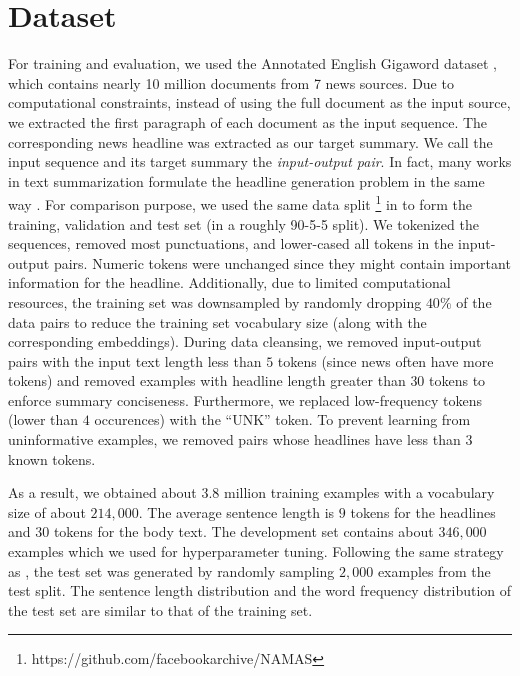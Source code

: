 \section{Dataset}
\label{sec: dataset}

For training and evaluation, we used the Annotated English Gigaword dataset \cite{graff2003english}, which contains nearly 10 million documents from 7 news sources. Due to computational constraints, instead of using the full document as the input source, we extracted the first paragraph of each document as the input sequence. The corresponding news headline was extracted as our target summary. We call the input sequence and its target summary the \textit{input-output pair}. In fact, many works in text summarization formulate the headline generation problem in the same way \cite{rush2015neural}. For comparison purpose, we used the same data split \footnote{https://github.com/facebookarchive/NAMAS} in \cite{rush2015neural} to form the training, validation and test set (in a roughly 90-5-5 split). We tokenized the sequences, removed most punctuations, and lower-cased all tokens in the input-output pairs. Numeric tokens were unchanged since they might contain important information for the headline. Additionally, due to limited computational resources, the training set was downsampled by randomly dropping $40\%$ of the data pairs to reduce the training set vocabulary size (along with the corresponding embeddings). During data cleansing, we removed input-output pairs with the input text length less than $5$ tokens (since news often have more tokens) and removed examples with headline length greater than $30$ tokens to enforce summary conciseness. Furthermore, we replaced low-frequency tokens (lower than $4$ occurences) with the ``UNK'' token. To prevent learning from uninformative examples, we removed pairs whose headlines have less than $3$ known tokens. 

As a result, we obtained about $3.8$ million training examples with a vocabulary size of about $214,000$. The average sentence length is $9$ tokens for the headlines and $30$ tokens for the body text. The development set contains about $346,000$ examples which we used for hyperparameter tuning. Following the same strategy as \cite{rush2015neural}, the test set was generated by randomly sampling $2,000$ examples from the test split. The sentence length distribution and the word frequency distribution of the test set are similar to that of the training set.
